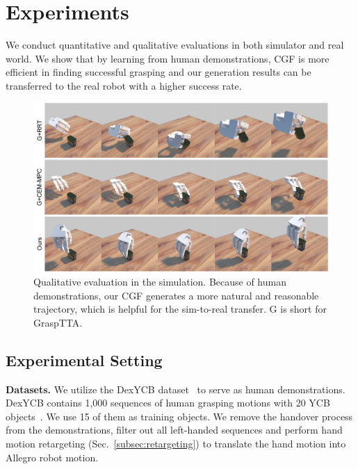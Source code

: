 \documentclass[letterpaper, 10 pt, journal, twoside]{IEEEtran}
\begin{document}
\vspace{-0.1in}
\section{Experiments}
\label{sec:experiments}

We conduct quantitative and qualitative evaluations in both simulator and real world. We show that by learning from human demonstrations, CGF is more efficient in finding successful grasping and our generation results can be transferred to the real robot with a higher success rate.

\begin{figure}[t]
\centering
  \vspace{-0.1in}
  \includegraphics[width=0.85\linewidth]{figure/compare.pdf}
  \vspace{-0.1in}
  \caption{\small
  Qualitative evaluation in the simulation. Because of human demonstrations, our CGF generates a more natural and reasonable trajectory, which is helpful for the sim-to-real transfer. G is short for GraspTTA.}
  \label{fig:compare}
  \vspace{-0.2in}
\end{figure}

\vspace{-0.1in}
\subsection{Experimental Setting}
\label{subsec:setting}

\textbf{Datasets.} We utilize the DexYCB dataset~\cite{chao2021dexycb} to serve as human demonstrations. DexYCB contains 1,000 sequences of human grasping motions with 20 YCB objects~\cite{calli2015ycb}. We use 15 of them as training objects. We remove the handover process from the demonstrations, filter out all left-handed sequences and perform hand motion retargeting (Sec.~\ref{subsec:retargeting}) to translate the hand motion into Allegro robot motion.
\end{document}
